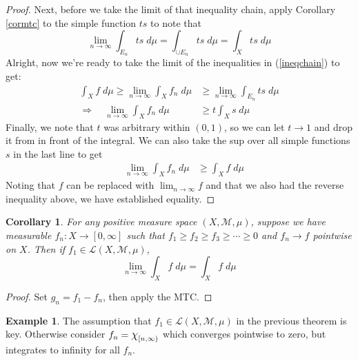 \documentclass[12pt]{article}
\theoremstyle{plain}
\newtheorem{cor}[thm]{Corollary}
\theoremstyle{definition}
\newtheorem{ex}[thm]{Example}
\theoremstyle{remark}
\newcommand*{\Chi}{\mbox{\large$\chi$}} %
\begin{document}
\begin{proof}
Next, before we take the limit of that inequality chain, apply Corollary \ref{cormtc} to the simple function $ts$ to note that 
\[
    \lim_{n\rightarrow\infty} \int_{E_n} ts \; d\mu
    = \int_{\cup E_n} ts \;d\mu
    = \int_{X} ts \;d\mu
\]
Alright, now we're ready to take the limit of the inequalities in (\ref{ineqchain}) to get:
\begin{align*}
    \int_X f\;d\mu \geq \lim_{n\rightarrow\infty}
    \int_X f_n\;d\mu &\geq
     \lim_{n\rightarrow\infty}\int_{E_n} ts \;d\mu \\
    \Rightarrow \quad\lim_{n\rightarrow\infty}
    \int_X f_n\;d\mu &\geq
     t\int_{X} s \;d\mu 
\end{align*}
Finally, we note that $t$ was arbitrary within $(0,1)$, so we can let $t\rightarrow 1$ and drop it from in front of the integral. We can also take the sup over all simple functions $s$ in the last line to get
\begin{align*}
     \quad\lim_{n\rightarrow\infty}
    \int_X f_n\;d\mu &\geq
    \int_{X} f \;d\mu 
\end{align*}
Noting that $f$ can be replaced with $\lim_{n\rightarrow\infty}f$ and that we also had the reverse inequality above, we have established equality.
\end{proof}

\begin{cor}
For any positive measure space $(X,\mathscr{M},\mu)$, suppose we have measurable $f_n:X\rightarrow[0,\infty]$ such that $f_1\geq f_2\geq f_3\geq\cdots\geq 0$ and $f_n\rightarrow f$ pointwise on $X$. Then if $f_1\in\mathscr{L}(X,\mathscr{M},\mu)$, 
\[
   \lim_{n\rightarrow\infty} \int_{X} f\; d\mu = \int_{X} f\; d\mu
\]
\end{cor}
\begin{proof}
Set $g_n=f_1-f_n$, then apply the MTC.
\end{proof}

\begin{ex}
The assumption that $f_1\in\mathscr{L}(X,\mathscr{M},\mu)$ in the previous theorem is key. Otherwise consider $f_n=\Chi_{[n,\infty)}$ which converges pointwise to zero, but integrates to infinity for all $f_n$. 
\end{ex}
\end{document}
